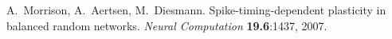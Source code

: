 \documentclass[]{YIC2015}
\begin{document}
\begin{thebibliography}{99}
  A.~Morrison, A.~Aertsen, M.~Diesmann. Spike-timing-dependent plasticity in balanced random networks. \textit{Neural Computation} \textbf{19.6}:1437, 2007.



\end{thebibliography}

\end{document}
